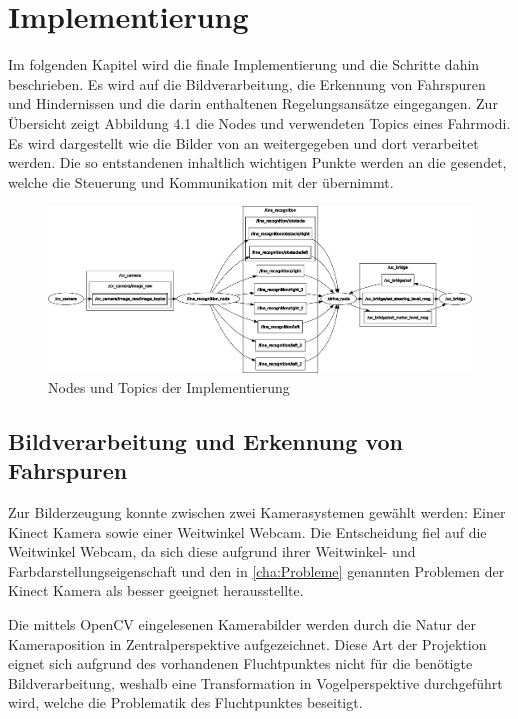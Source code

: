 \section{Implementierung}
\label{cha:Implementierung}
Im folgenden Kapitel wird die finale Implementierung und die Schritte dahin beschrieben. Es wird auf die Bildverarbeitung, die Erkennung von Fahrspuren und Hindernissen und die darin enthaltenen Regelungsansätze eingegangen.
Zur Übersicht zeigt Abbildung 4.1 die Nodes und verwendeten Topics eines Fahrmodi. Es wird dargestellt wie die Bilder von  an  weitergegeben und dort verarbeitet werden. Die so entstandenen inhaltlich wichtigen Punkte werden an die  gesendet, welche die Steuerung und Kommunikation mit der  übernimmt. 
\begin{figure}[h]
	\centering
	\includegraphics[width=\textwidth]{images/rosgraph.png}
	\caption{Nodes und Topics der Implementierung}
\end{figure}
\label{graph}

\subsection{Bildverarbeitung und Erkennung von Fahrspuren}
\label{sec:spurerkennung}
Zur Bilderzeugung konnte zwischen zwei Kamerasystemen gewählt werden: Einer Kinect Kamera sowie einer Weitwinkel Webcam. Die Entscheidung fiel auf die Weitwinkel Webcam, da sich diese aufgrund ihrer Weitwinkel- und Farbdarstellungseigenschaft und den in \autoref{cha:Probleme} genannten Problemen der Kinect Kamera als besser geeignet herausstellte. 

Die mittels OpenCV eingelesenen Kamerabilder werden durch die Natur der Kameraposition in Zentralperspektive aufgezeichnet. Diese Art der Projektion eignet sich aufgrund des vorhandenen Fluchtpunktes nicht für die benötigte Bildverarbeitung, weshalb eine Transformation in Vogelperspektive durchgeführt wird, welche die Problematik des Fluchtpunktes beseitigt.

